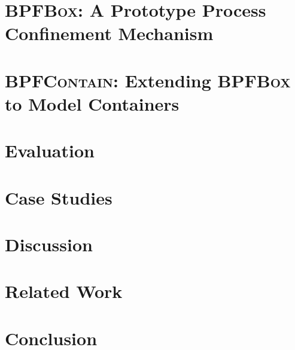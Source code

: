 \documentclass[
  fontsize=12pt,
  titlepage=firstiscover,
  paper=letter,
  twoside,
  cleardoublepage=plain,
  parskip=half-,
  DIV=10,
  parindent,
  appendixprefix,
  chapterprefix,
]{scrbook}
\newcommand{\bpfbox}{\textsc{BPFBox}}
\newcommand{\bpfcontain}{\textsc{BPFContain}}
\begin{document}
\chapter{\bpfbox: A Prototype Process Confinement Mechanism}%
\label{c:bpfbox}


\chapter{\bpfcontain: Extending \bpfbox{} to Model Containers}%
\label{c:bpfcontain}


\chapter{Evaluation}%
\label{c:evaluation}

\chapter{Case Studies}%
\label{c:case-studies}

\chapter{Discussion}%
\label{c:discussion}


\chapter{Related Work}%
\label{c:related}


\chapter{Conclusion}%
\label{c:conclusion}


\cleardoublepage%
\printbibliography%
%
\nocite{*} %

\appendix%
\printglossary[type=\acronymtype, title=List of Acronyms, toctitle=List of Acronyms]
\end{document}
